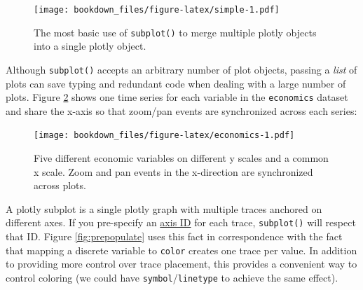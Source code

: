 \documentclass[12pt,]{isuthesis}
\newenvironment{Shaded}{\begin{snugshade}}{\end{snugshade}}
\newcommand{\KeywordTok}[1]{\textcolor[rgb]{0.13,0.29,0.53}{\textbf{{#1}}}}
\newcommand{\DataTypeTok}[1]{\textcolor[rgb]{0.13,0.29,0.53}{{#1}}}
\newcommand{\StringTok}[1]{\textcolor[rgb]{0.31,0.60,0.02}{{#1}}}
\newcommand{\OtherTok}[1]{\textcolor[rgb]{0.56,0.35,0.01}{{#1}}}
\newcommand{\NormalTok}[1]{{#1}}
\begin{document}
\begin{figure}
\centering
\texttt{[image: bookdown\_files/figure-latex/simple-1.pdf]}
\caption{\label{fig:simple}The most basic use of \texttt{subplot()} to merge
multiple plotly objects into a single plotly object.}
\end{figure}

Although \texttt{subplot()} accepts an arbitrary number of plot objects,
passing a \emph{list} of plots can save typing and redundant code when
dealing with a large number of plots. Figure \ref{fig:economics} shows
one time series for each variable in the \texttt{economics} dataset and
share the x-axis so that zoom/pan events are synchronized across each
series:

\begin{Shaded}
\end{Shaded}

\begin{figure}
\centering
\texttt{[image: bookdown\_files/figure-latex/economics-1.pdf]}
\caption{\label{fig:economics}Five different economic variables on different
y scales and a common x scale. Zoom and pan events in the x-direction
are synchronized across plots.}
\end{figure}

A plotly subplot is a single plotly graph with multiple traces anchored
on different axes. If you pre-specify an
\href{https://plot.ly/r/reference/\#scatter-yaxis}{axis ID} for each
trace, \texttt{subplot()} will respect that ID. Figure
\ref{fig:prepopulate} uses this fact in correspondence with the fact
that mapping a discrete variable to \texttt{color} creates one trace per
value. In addition to providing more control over trace placement, this
provides a convenient way to control coloring (we could have
\texttt{symbol}/\texttt{linetype} to achieve the same effect).
\end{document}
